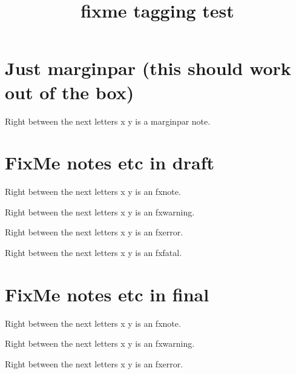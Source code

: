 \documentclass{article}
\title{fixme tagging test}
\begin{document}
\section{Just marginpar (this should work out of the box)}


Right between the next letters x    y is a marginpar note.


\section{FixMe notes etc in draft}


Right between the next letters x    y is an fxnote.

Right between the next letters x    y is an fxwarning.

Right between the next letters x    y is an fxerror.

Right between the next letters x    y is an fxfatal.

\section{FixMe notes etc in final}


Right between the next letters x    y is an fxnote.

Right between the next letters x    y is an fxwarning.

Right between the next letters x    y is an fxerror.



\end{document}
